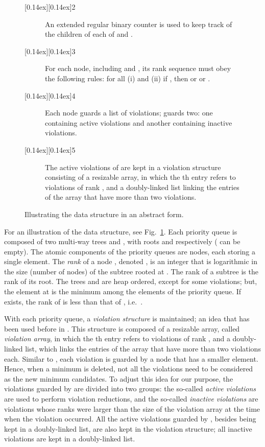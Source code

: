 \documentclass{llncs}
\newcommand{\circled}[1]{\raisebox{0.14ex}[0.14ex][0.14ex]{\textbigcircle}\hspace*{-0.82em}#1}
\begin{document}
\begin{figure}[!tb]
\begin{description}
\item[{\normalfont\circled{2}}~\,] An
  extended regular binary counter is used to keep track of the children
  of each of  and .

\item[{\normalfont\circled{3}}~\,] For each node, including  and
  , its rank sequence 
  must obey the following rules: for all 
  (i)  and (ii) if , then  or
   or .

\item[{\normalfont\circled{4}}~\,] Each node guards a list of violations;
   guards two: one containing active violations and another
  containing inactive violations.

\item[{\normalfont\circled{5}}~\,] The active violations of  are kept 
   in a violation structure consisting of a resizable array, in which the th entry 
   refers to violations of rank , and a doubly-linked 
   list linking the entries of the array that have more than two violations.
\end{description}
\vspace{-.2in}
\caption{Illustrating the data structure in an abstract form.\label{fig:abstract}}
\vspace{-.2in}
\end{figure}

For an illustration of the data structure, see Fig.~\ref{fig:abstract}.
Each priority queue is composed of two multi-way trees  and
, with roots  and  respectively ( can be empty).   
The atomic components of the priority queues are nodes, each storing a single element.  
The \emph{rank} of a node , denoted , is an integer 
that is logarithmic in the size (number of nodes) of the subtree rooted at . 
The rank of a subtree is the rank of its root.
The trees  and  are heap ordered, except for some violations; 
but, the element at  is the minimum among the elements of the
priority queue. If  exists, the rank of  is less than that of , 
i.e.~.  

With each priority queue, a \emph{violation structure} is maintained;
an idea that has been used before in \cite{Bro96,DGST88,KST02}. 
This structure is composed of a resizable array, called \emph{violation array}, in which the th entry 
refers to violations of rank , and a doubly-linked list, which links 
the entries of the array that have more than two violations each.  
Similar to \cite{Bro96}, each violation is guarded by a node that has a smaller element. 
Hence, when a minimum is deleted, not all the violations need to be considered 
as the new minimum candidates.  
To adjust this idea for our purpose, the violations guarded by  
are divided into two groups: the so-called \emph{active violations} are 
used to perform violation reductions, and the so-called \emph{inactive violations} 
are violations whose ranks were larger than the size of the violation array 
at the time when the violation occurred.  
All the active violations guarded by , besides being kept in a doubly-linked list, 
are also kept in the violation structure; all inactive violations are kept in a doubly-linked list. 
\end{document}
